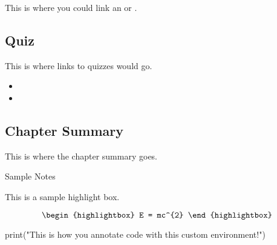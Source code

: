 This is where you could link an  or . 

\subsection{Quiz}

This is where links to quizzes would go.

\begin{itemize}
    \item {} 
    \item {} 
\end{itemize}

\subsection{Chapter Summary}

This is where the chapter summary goes. \clearpage

\begin{notes}{Sample Notes}
    \begin{highlight}
        This is a sample highlight box.

        \begin{equation*}
            \begin{highlightbox}
                E = mc^{2}
            \end{highlightbox}
        \end{equation*}
    \end{highlight}
    \begin{code}[Python]
    print("This is how you annotate code with this custom environment!")
    \end{code}
\end{notes}
